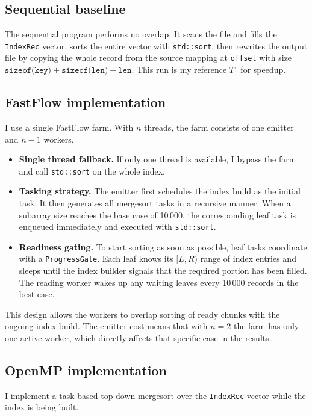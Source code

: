 \documentclass[12pt]{article}
\begin{document}
\subsection{Sequential baseline}
The sequential program performs no overlap. It scans the file and fills the \texttt{IndexRec} vector, sorts the entire vector with \texttt{std::sort}, then rewrites the output file by copying the whole record from the source mapping at \texttt{offset} with size \(\texttt{sizeof(key)}+\texttt{sizeof(len)}+\texttt{len}\). This run is my reference \(T_1\) for speedup.

\subsection{FastFlow implementation}
I use a single FastFlow farm. With \(n\) threads, the farm consists of one emitter and \(n-1\) workers.

\begin{itemize}
  \item \textbf{Single thread fallback.} If only one thread is available, I bypass the farm and call \texttt{std::sort} on the whole index.
  \item \textbf{Tasking strategy.} The emitter first schedules the index build as the initial task. It then generates all mergesort tasks in a recursive manner. When a subarray size reaches the base case of 10\,000, the corresponding leaf task is enqueued immediately and executed with \texttt{std::sort}.
  \item \textbf{Readiness gating.} To start sorting as soon as possible, leaf tasks coordinate with a \texttt{ProgressGate}. Each leaf knows its \([L, R)\) range of index entries and sleeps until the index builder signals that the required portion has been filled. The reading worker wakes up any waiting leaves every 10\,000 records in the best case.
\end{itemize}

This design allows the workers to overlap sorting of ready chunks with the ongoing index build. The emitter cost means that with \(n=2\) the farm has only one active worker, which directly affects that specific case in the results.

\subsection{OpenMP implementation}
I implement a task based top down mergesort over the \texttt{IndexRec} vector while the index is being built.
\end{document}
